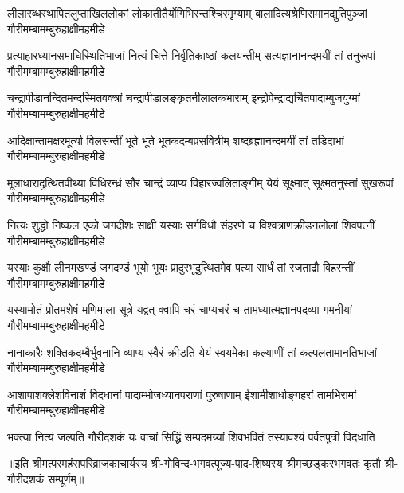 


\fourlineindentedshloka
{लीलारब्धस्थापितलुप्ताखिललोकां}
{लोकातीतैर्योगिभिरन्तश्चिरमृग्याम्}
{बालादित्यश्रेणिसमानद्युतिपुञ्जां}
{गौरीमम्बामम्बुरुहाक्षीमहमीडे}

\fourlineindentedshloka
{प्रत्याहारध्यानसमाधिस्थितिभाजां}
{नित्यं चित्ते निर्वृतिकाष्ठां कलयन्तीम्}
{सत्यज्ञानानन्दमयीं तां तनुरूपां}
{गौरीमम्बामम्बुरुहाक्षीमहमीडे}

\fourlineindentedshloka
{चन्द्रापीडानन्दितमन्दस्मितवक्त्रां}
{चन्द्रापीडालङ्कृतनीलालकभाराम्}
{इन्द्रोपेन्द्राद्यर्चितपादाम्बुजयुग्मां}
{गौरीमम्बामम्बुरुहाक्षीमहमीडे}

\fourlineindentedshloka
{आदिक्षान्तामक्षरमूर्त्या विलसन्तीं}
{भूते भूते भूतकदम्बप्रसवित्रीम्}
{शब्दब्रह्मानन्दमयीं तां तडिदाभां}
{गौरीमम्बामम्बुरुहाक्षीमहमीडे}

\fourlineindentedshloka
{मूलाधारादुत्थितवीथ्या विधिरन्ध्रं}
{सौरं चान्द्रं व्याप्य विहारज्वलिताङ्गीम्}
{येयं सूक्ष्मात् सूक्ष्मतनुस्तां सुखरूपां}
{गौरीमम्बामम्बुरुहाक्षीमहमीडे}

\fourlineindentedshloka
{नित्यः शुद्धो निष्कल एको जगदीशः}
{साक्षी यस्याः सर्गविधौ संहरणे च}
{विश्वत्राणक्रीडनलोलां शिवपत्नीं}
{गौरीमम्बामम्बुरुहाक्षीमहमीडे}

\fourlineindentedshloka
{यस्याः कुक्षौ लीनमखण्डं जगदण्डं}
{भूयो भूयः प्रादुरभूदुत्थितमेव}
{पत्या सार्धं तां रजताद्रौ विहरन्तीं}
{गौरीमम्बामम्बुरुहाक्षीमहमीडे}

\fourlineindentedshloka
{यस्यामोतं प्रोतमशेषं मणिमाला}
{सूत्रे यद्वत् क्वापि चरं चाप्यचरं च}
{तामध्यात्मज्ञानपदव्या गमनीयां}
{गौरीमम्बामम्बुरुहाक्षीमहमीडे}

\fourlineindentedshloka
{नानाकारैः शक्तिकदम्बैर्भुवनानि}
{व्याप्य स्वैरं क्रीडति येयं स्वयमेका}
{कल्याणीं तां कल्पलतामानतिभाजां}
{गौरीमम्बामम्बुरुहाक्षीमहमीडे}

\fourlineindentedshloka
{आशापाशक्लेशविनाशं विदधानां}
{पादाम्भोजध्यानपराणां पुरुषाणाम्}
{ईशामीशार्धाङ्गहरां तामभिरामां}
{गौरीमम्बामम्बुरुहाक्षीमहमीडे}

{भक्त्या नित्यं जल्पति गौरीदशकं यः}
{वाचां सिद्धिं सम्पदमग्र्यां शिवभक्तिं}
{तस्यावश्यं पर्वतपुत्री विदधाति}

॥इति श्रीमत्परमहंसपरिव्राजकाचार्यस्य श्री-गोविन्द-भगवत्पूज्य-पाद-शिष्यस्य
श्रीमच्छङ्करभगवतः कृतौ श्री-गौरीदशकं सम्पूर्णम्॥